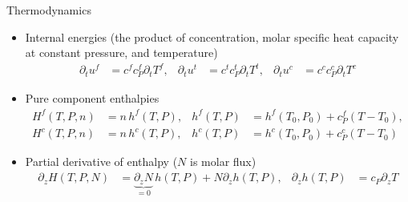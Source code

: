 \begin{frame}{Thermodynamics}
	\begin{scriptsize}
		\begin{itemize}
			\item Internal energies (the product of concentration, molar specific heat capacity at constant pressure, and temperature)
			\begin{align}
				\partial_t u^f &= c^f c_P^f \partial_t T^f, &
				\partial_t u^t &= c^t c_P^t \partial_t T^t, &
				\partial_t u^c &= c^c c_P^c \partial_t T^c
			\end{align}
			\item Pure component enthalpies
			\begin{subequations}
				\begin{align}
					H^f(T, P, n) &= n\, h^f(T, P), &
					h^f(T, P) &= h^f(T_0, P_0) + c_P^f (T - T_0), \\
					H^c(T, P, n) &= n\, h^c(T, P), &
					h^c(T, P) &= h^c(T_0, P_0) + c_P^c (T - T_0)
				\end{align}
			\end{subequations}
			\item Partial derivative of enthalpy ($N$ is molar flux)
			\begin{align}
				\partial_z H(T, P, N) &= \underbrace{\partial_z N}_{=0}\, h(T, P) + N \partial_z h(T, P), &
				\partial_z h(T, P) &= c_P \partial_z T
			\end{align}
		\end{itemize}
	\end{scriptsize}
\end{frame}